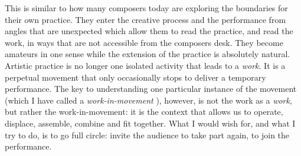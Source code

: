\documentclass[11pt]{article}
\begin{document}
This is similar to how many composers today are exploring the boundaries for their own practice. They enter the creative process and the performance from angles that are unexpected which allow them to read the practice, and read the work, in ways that are not accessible from the composers desk. They become amateurs in one sense while the extension of the practice is absolutely natural. Artistic practice is no longer one isolated activity that leads to a \emph{work}. It is a perpetual movement that only occasionally stops to deliver a temporary performance. The key to understanding one particular instance of the movement (which I have called a \emph{work-in-movement} \citep{frisk08}), however, is not the work as a \emph{work}, but rather the work-in-movement: it is the context that allows us to operate, displace, assemble, combine and fit together. What I would wish for, and what I try to do, is to go full circle: invite the audience to take part again, to join the performance.










\end{document}
